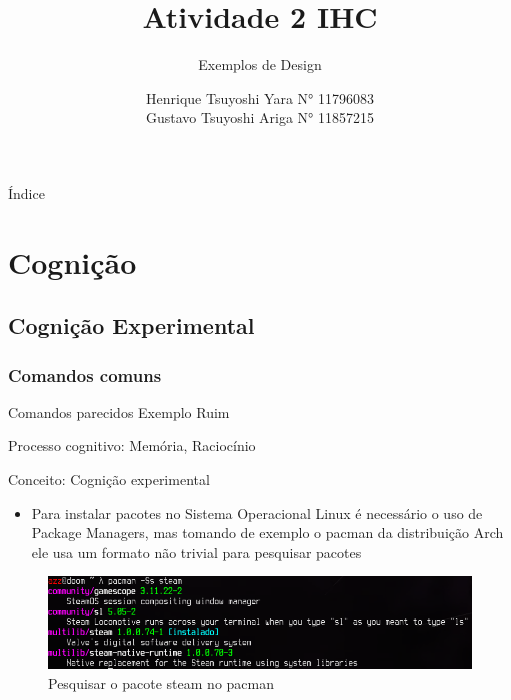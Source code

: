 \documentclass{beamer}
\title {Atividade 2 IHC}
\subtitle {Exemplos de Design}
\author {Henrique Tsuyoshi Yara N° 11796083 \\ 
        Gustavo Tsuyoshi Ariga N° 11857215}
\institute {USP - Universidade de São Paulo}
\begin{document}
\begin{frame}{\titlepage}
\end{frame}

\begin{frame}{Índice}
\begin{multicols}{2}
  \tableofcontents
\end{multicols}
\end{frame}

\section{Cognição}
\subsection{Cognição Experimental}
\subsubsection{Comandos comuns}

\begin{frame}{Comandos parecidos Exemplo Ruim}

Processo cognitivo: Memória, Raciocínio

Conceito: Cognição experimental

\begin{itemize}
    \item Para instalar pacotes no Sistema Operacional Linux é necessário o uso de Package Managers, mas tomando de exemplo o pacman da distribuição Arch ele usa um formato não trivial para pesquisar pacotes 
\end{itemize}
\begin{figure}
    \centering
    \includegraphics[scale=0.4]{images/Pacman-search.png}
    \caption{Pesquisar o pacote steam no pacman}
\end{figure}

\end{frame}
\end{document}
